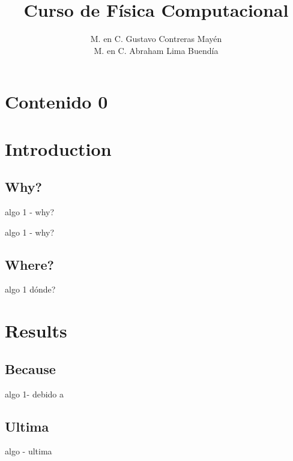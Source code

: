 \documentclass[12pt]{beamer}
\title{Curso de Física Computacional}
\author[]{M. en C. Gustavo Contreras Mayén \\ M. en C. Abraham Lima Buendía}
\date{ }
\begin{document}
\maketitle

\section*{Contenido 0}
\frame{\tableofcontents[hideallsubsections]}
\section{Introduction}
\subsection{Why?}
\begin{frame}
algo 1 - why?
\end{frame}
\begin{frame}
algo 1 - why?
\end{frame}
\subsection{Where?}
\begin{frame}
algo 1 dónde?
\end{frame}
\section{Results}
\subsection{Because}
\begin{frame}
algo 1- debido a
\end{frame}
\subsection{Ultima}
\begin{frame}
algo - ultima
\end{frame}
\end{document}
